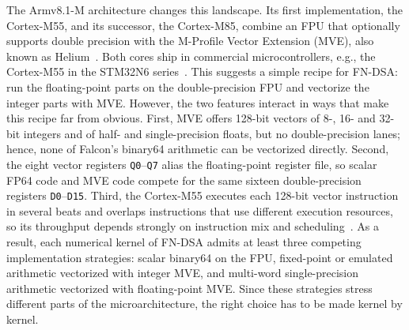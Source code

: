 The Armv8.1-M architecture changes this landscape.
Its first implementation, the Cortex-M55, and its successor, the Cortex-M85,
combine an FPU that optionally supports double precision with the M-Profile
Vector Extension (MVE), also known as Helium~\cite{ArmV8MARM}.
Both cores ship in commercial microcontrollers, e.g., the Cortex-M55 in the
STM32N6 series~\cite{STM32N6DS}.
This suggests a simple recipe for FN-DSA: run the floating-point parts on the
double-precision FPU and vectorize the integer parts with MVE.
However, the two features interact in ways that make this recipe far from
obvious.
First, MVE offers 128-bit vectors of 8-, 16- and 32-bit integers and of
half- and single-precision floats, but no double-precision lanes; hence, none
of Falcon's binary64 arithmetic can be vectorized directly.
Second, the eight vector registers \texttt{Q0}--\texttt{Q7} alias the
floating-point register file, so scalar FP64 code and MVE code compete for
the same sixteen double-precision registers \texttt{D0}--\texttt{D15}.
Third, the Cortex-M55 executes each 128-bit vector instruction in several
beats and overlaps instructions that use different execution resources, so
its throughput depends strongly on instruction mix and
scheduling~\cite{BMKYV22,SLOTHY}.
As a result, each numerical kernel of FN-DSA admits at least three competing
implementation strategies: scalar binary64 on the FPU, fixed-point or
emulated arithmetic vectorized with integer MVE, and multi-word
single-precision arithmetic vectorized with floating-point MVE.
Since these strategies stress different parts of the microarchitecture, the
right choice has to be made kernel by kernel.

